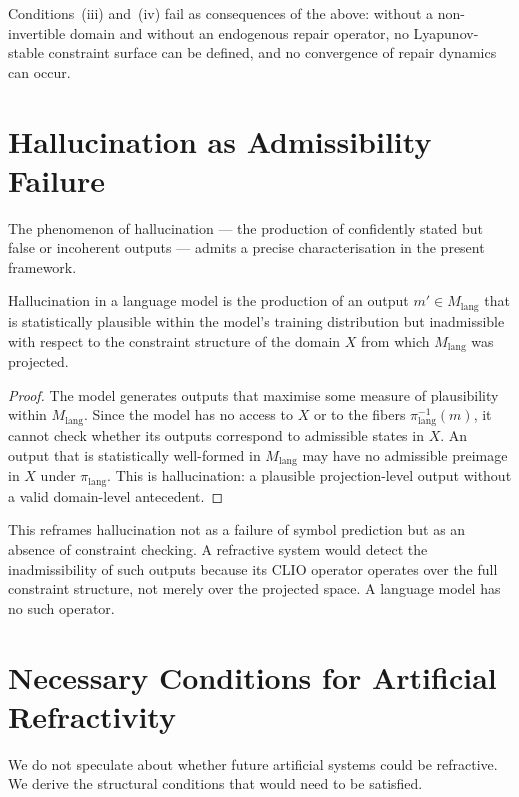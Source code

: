 \documentclass[11pt,openany]{book}
\begin{document}
Conditions~(iii) and~(iv) fail as consequences of the above:
without a non-invertible domain and without an endogenous
repair operator, no Lyapunov-stable constraint surface can
be defined, and no convergence of repair dynamics can occur.

\section{Hallucination as Admissibility Failure}
\label{sec:hallucination}

The phenomenon of hallucination — the production of
confidently stated but false or incoherent outputs — admits
a precise characterisation in the present framework.

\begin{proposition}
\label{prop:hallucination}
Hallucination in a language model is the production of an
output $m' \in M_{\mathrm{lang}}$ that is statistically
plausible within the model's training distribution but
inadmissible with respect to the constraint structure of
the domain $X$ from which $M_{\mathrm{lang}}$ was
projected.
\end{proposition}

\begin{proof}
The model generates outputs that maximise some measure of
plausibility within $M_{\mathrm{lang}}$.  Since the model
has no access to $X$ or to the fibers
$\pi_{\mathrm{lang}}^{-1}(m)$, it cannot check whether its
outputs correspond to admissible states in $X$.  An output
that is statistically well-formed in $M_{\mathrm{lang}}$
may have no admissible preimage in $X$ under
$\pi_{\mathrm{lang}}$.  This is hallucination: a plausible
projection-level output without a valid domain-level
antecedent.
\end{proof}

This reframes hallucination not as a failure of symbol
prediction but as an absence of constraint checking.  A
refractive system would detect the inadmissibility of such
outputs because its CLIO operator operates over the full
constraint structure, not merely over the projected space.
A language model has no such operator.

\section{Necessary Conditions for Artificial Refractivity}
\label{sec:future-conditions}

We do not speculate about whether future artificial systems
could be refractive.  We derive the structural conditions
that would need to be satisfied.
\end{document}
